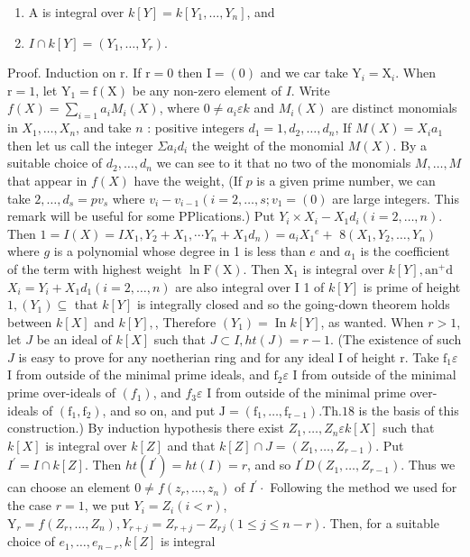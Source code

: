 \begin{enumerate}
  \item A is integral over $k[Y]=k\left[Y_{1}, \ldots, Y_{n}\right]$, and

  \item $I \cap k[Y]=\left(Y_{1}, \ldots, Y_{r}\right)$.

\end{enumerate}
Proof. Induction on $\mathrm{r}$. If $\mathrm{r}=0$ then $\mathrm{I}=(0)$ and we car take $\mathrm{Y}_{i}=\mathrm{X}_{i}$. When $\mathrm{r}=1$, let $\mathrm{Y}_{1}=\mathrm{f}(\mathrm{X})$ be any non-zero element of $I$. Write $f(X)=\sum_{i=1} a_{i} M_{i}(X)$, where $0 \neq a_{i} \varepsilon k$ and $M_{i}(X)$ are distinct monomials in $X_{1}, \ldots, X_{n}$, and take $n$ : positive integers $d_{1}=1, d_{2}, \ldots, d_{n}$, If $M(X)=X_{i} a_{1}$ then let us call the integer $\Sigma a_{i} d_{i}$ the weight of the monomial $M(X)$. By a suitable choice of $d_{2}, \ldots, d_{n}$ we can see to it that no two of the monomials $M, \ldots, M$ that appear in $f(X)$ have the weight, (If $p$ is a given prime number, we can take $2, \ldots, d_{s}=p v_{s}$ where $v_{i}-v_{i-1}\left(i=2, \ldots, s ; v_{1}=(0)\right.$ are large integers. This remark will be useful for some PPlications.) Put $Y_{i} \times X_{i}-X_{1} d_{i}(i=2, \ldots, n)$. Then $\left.1=I(X)=I X_{1}, Y_{2}+X_{1}, \cdots Y_{n}+X_{1} d_{n}\right)=a_{i} X_{1}{ }^{e}+$ $8\left(X_{1}, Y_{2}, \ldots, Y_{n}\right)$ where $g$ is a polynomial whose degree in 1 is less than $e$ and $a_{1}$ is the coefficient of the term with highest weight $\ln \mathrm{F}(\mathrm{X})$. Then $\mathrm{X}_{1}$ is integral over $k[Y], \mathrm{an}^{+} \mathrm{d}$ $X_{i}=Y_{i}+X_{1} d_{1}(i=2, \ldots, n)$ are also integral over I 1 of $k[Y]$ is prime of height $1,\left(Y_{1}\right) \subseteq$ that $k[Y]$ is integrally closed and so the going-down theorem holds between $k[X]$ and $k[Y],$, Therefore $\left(Y_{1}\right)=\operatorname{In} k[Y]$, as wanted. When $r>1$, let $J$ be an ideal of $k[X]$ such that $J \subset I, h t(J)=r-1$. (The existence of such $J$ is easy to prove for any noetherian ring and for any ideal I of height r. Take $\mathrm{f}_{1} \varepsilon$ I from outside of the minimal prime ideals, and $\mathrm{f}_{2} \varepsilon$ I from outside of the minimal prime over-ideals of $\left(f_{1}\right)$, and $f_{3} \varepsilon$ I from outside of the minimal prime over-ideals of $\left(\mathrm{f}_{1}, \mathrm{f}_{2}\right)$, and so on, and put $\mathrm{J}=\left(\mathrm{f}_{1}, \ldots, \mathrm{f}_{\mathrm{r}-1}\right) . \mathrm{Th} .18$ is the basis of this construction.) By induction hypothesis there exist $Z_{1}, \ldots, Z_{n} \varepsilon k[X]$ such that $k[X]$ is integral over $k[Z]$ and that $k[Z] \cap J=\left(Z_{1}, \ldots, Z_{r-1}\right)$. Put $I^{\prime}=I \cap k[Z]$. Then $h t\left(I^{\prime}\right)=h t(I)=r$, and so $I^{\prime} D\left(Z_{1}, \ldots, Z_{r-1}\right)$. Thus we can choose an element $0 \neq f\left(z_{r}, \ldots, z_{n}\right)$ of $I^{\prime} \cdot$ Following the method we used for the case $r=1$, we put $Y_{i}=Z_{i}(i<r)$, $\mathrm{Y}_{r}=f\left(Z_{r}, \ldots, Z_{n}\right), Y_{r+j}=Z_{r+j}-Z_{r}{ }_{j}(1 \leqslant j \leqslant n-r)$. Then, for a suitable choice of $e_{1}, \ldots, e_{n-r}, k[Z]$ is integral 